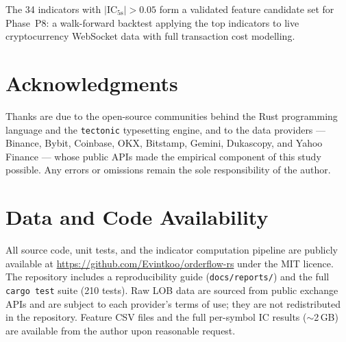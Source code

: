 \documentclass[12pt,a4paper]{article}
\theoremstyle{definition}
\theoremstyle{remark}
\newcommand{\IC}{\mathrm{IC}}
\begin{document}
The 34 indicators with $|\IC_{5\text{s}}| > 0.05$ form a validated
feature candidate set for Phase~P8: a walk-forward backtest applying
the top indicators to live cryptocurrency WebSocket data with full
transaction cost modelling.

\section*{Acknowledgments}

Thanks are due to the open-source communities behind the Rust
programming language and the \texttt{tectonic} typesetting engine,
and to the data providers --- Binance, Bybit, Coinbase, OKX,
Bitstamp, Gemini, Dukascopy, and Yahoo Finance --- whose public
APIs made the empirical component of this study possible.
Any errors or omissions remain the sole responsibility of the author.

\section*{Data and Code Availability}

All source code, unit tests, and the indicator computation pipeline
are publicly available at
\url{https://github.com/Evintkoo/orderflow-rs} under the MIT licence.
The repository includes a reproducibility guide
(\texttt{docs/reports/}) and the full \texttt{cargo test} suite
(210 tests). Raw LOB data are sourced from public exchange APIs and
are subject to each provider's terms of use; they are not redistributed
in the repository. Feature CSV files and the full per-symbol IC results
($\sim$2\,GB) are available from the author upon reasonable request.
\end{document}
